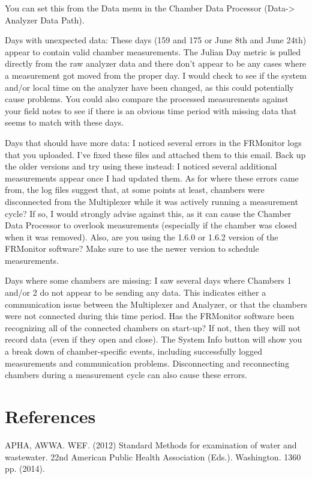 \documentclass[12pt]{../SOP3}\usepackage[]{graphicx}\usepackage[]{color}
\begin{document}
You can set this from the Data menu in the Chamber Data Processor (Data-> Analyzer Data Path).

Days with unexpected data:  These days (159 and 175 or June 8th and June 24th) appear to contain valid chamber measurements. The Julian Day metric is pulled directly from the raw analyzer data and there don't appear to be any cases where a measurement got moved from the proper day. I would check to see if the system and/or local time on the analyzer have been changed, as this could potentially cause problems. You could also compare the processed measurements against your field notes to see if there is an obvious time period with missing data that seems to match with these days.

Days that should have more data: I noticed several errors in the FRMonitor logs that you uploaded. I've fixed these files and attached them to this email. Back up the older versions and try using these instead: I noticed several additional measurements appear once I had updated them. As for where these errors came from, the log files suggest that, at some points at least, chambers were disconnected from the Multiplexer while it was actively running a measurement cycle? If so, I would strongly advise against this, as it can cause the Chamber Data Processor to overlook measurements (especially if the chamber was closed when it was removed). Also, are you using the 1.6.0 or 1.6.2 version of the FRMonitor software? Make sure to use the newer version to schedule measurements.


Days where some chambers are missing: I saw several days where Chambers 1 and/or 2 do not appear to be sending any data. This indicates either a communication issue between the Multiplexer and Analyzer, or that the chambers were not connected during this time period. Has the FRMonitor software been recognizing all of the connected chambers on start-up?  If not, then they will not record data (even if they open and close). The System Info button will show you a break down of chamber-specific events, including successfully logged measurements and communication problems. Disconnecting and reconnecting chambers during a measurement cycle can also cause these errors.




\section{References}



\NP APHA, AWWA. WEF. (2012) Standard Methods for examination of water and wastewater. 22nd American Public Health Association (Eds.). Washington. 1360 pp. (2014).
\end{document}
